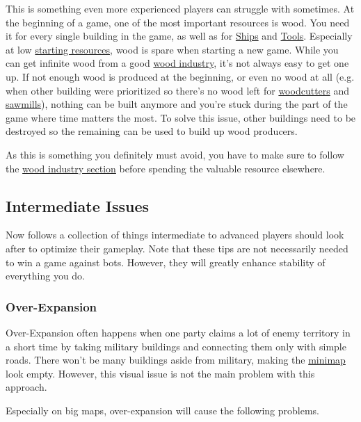 \documentclass[12pt]{article}
\begin{document}
This is something even more experienced players can struggle with sometimes. At the beginning of a game, one of the most important resources is wood. You need it for every single building in the game, as well as for \hyperref[sec:ships]{Ships} and \hyperref[sec:toolsmith]{Tools}. Especially at low \hyperref[sec:startingresources]{starting resources}, wood is spare when starting a new game. While you can get infinite wood from a good \hyperref[sec:woodindustry]{wood industry}, it's not always easy to get one up. If not enough wood is produced at the beginning, or even no wood at all (e.g. when other building were prioritized so there's no wood left for \hyperref[sec:woodcutter]{woodcutters} and \hyperref[sec:sawmill]{sawmills}), nothing can be built anymore and you're stuck during the part of the game where time matters the most. To solve this issue, other buildings need to be destroyed so the remaining can be used to build up wood producers.

As this is something you definitely must avoid, you have to make sure to follow the \hyperref[sec:woodindustry]{wood industry section} before spending the valuable resource elsewhere.

\subsection{Intermediate Issues}
\label{sec:intermediateissues}

Now follows a collection of things intermediate to advanced players should look after to optimize their gameplay. Note that these tips are not necessarily needed to win a game against bots. However, they will greatly enhance stability of everything you do.

\subsubsection{Over-Expansion}
\label{sec:overexpansion}

Over-Expansion often happens when one party claims a lot of enemy territory in a short time by taking military buildings and connecting them only with simple roads. There won't be many buildings aside from military, making the \hyperref[sec:minimap]{minimap} look empty. However, this visual issue is not the main problem with this approach.

Especially on big maps, over-expansion will cause the following problems.
\end{document}

